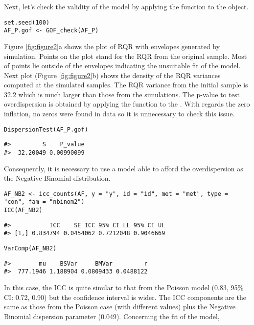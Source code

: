 Next, let's check the validity of the model by applying the function  to the  object.

\begin{verbatim}
set.seed(100)
AF_P.gof <- GOF_check(AF_P)
\end{verbatim}

Figure \ref{fig:figure2}a shows the plot of RQR with envelopes generated by simulation. Points on the plot stand for the RQR from the original sample. Most of points lie outside of the envelopes indicating the unsuitable fit of the model. Next plot (Figure \ref{fig:figure2}b) shows the density of the RQR variances computed at the simulated samples. The RQR variance from the initial sample is 32.2 which is much larger than those from the simulations. The p-value to test overdispersion is obtained by applying the function  to the . With regards the zero inflation, no zeros were found in data so it is unnecessary to check this issue.

\begin{verbatim}
DispersionTest(AF_P.gof)
\end{verbatim}

\begin{verbatim}
#>         S    P_value
#>  32.20049 0.00990099
\end{verbatim}

Consequently, it is necessary to use a model able to afford the overdispersion as the Negative Binomial distribution.

\begin{verbatim}
AF_NB2 <- icc_counts(AF, y = "y", id = "id", met = "met", type = "con", fam = "nbinom2")
ICC(AF_NB2)
\end{verbatim}

\begin{verbatim}
#>           ICC    SE ICC 95% CI LL 95% CI UL
#> [1,] 0.834794 0.0454062 0.7212048 0.9046669
\end{verbatim}

\begin{verbatim}
VarComp(AF_NB2)
\end{verbatim}

\begin{verbatim}
#>        mu    BSVar     BMVar         r
#>  777.1946 1.188904 0.0809433 0.0488122
\end{verbatim}

In this case, the ICC is quite similar to that from the Poisson model (0.83, 95\% CI: 0.72, 0.90) but the confidence interval is wider. The ICC components are the same as those from the Poisson case (with different values) plus the Negative Binomial dispersion parameter (0.049). Concerning the fit of the model,

